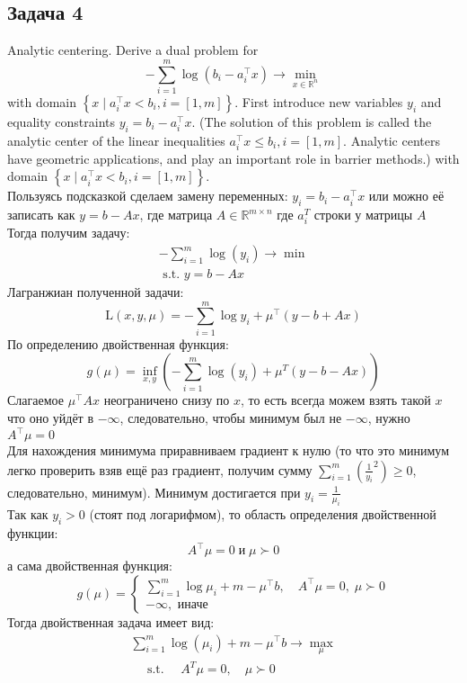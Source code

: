 \documentclass[a4paper,12pt]{article} %
\begin{document}
\subsection*{Задача 4}
Analytic centering. Derive a dual problem for
$$
-\sum_{i=1}^{m} \log \left(b_{i}-a_{i}^{\top} x\right) \rightarrow \min _{x \in \mathbb{R}^{n}}
$$
with domain $\left\{x \mid a_{i}^{\top} x<b_{i}, i=[1, m]\right\} .$ First introduce new variables $y_{i}$ and equality constraints $y_{i}=b_{i}-a_{i}^{\top} x$. (The solution of this problem is called the analytic center of the linear inequalities $a_{i}^{\top} x \leq b_{i}, i=[1, m] .$ Analytic centers have geometric applications, and play an important role in barrier methods.) with domain $\left\{x \mid a_{i}^{\top} x<b_{i}, i=[1, m]\right\}$. \\

Пользуясь подсказкой сделаем замену переменных: $y_{i}=b_{i}-a_{i}^{\top} x$ или можно её записать как $ y = b - Ax $, где матрица $A \in \mathbb{R}^{m \times n} $ где $ a_{i}^{T} $ строки у матрицы $ A $\\
Тогда получим задачу: 
$$
\begin{array}{l}
-\sum_{i=1}^{m} \log \left(y_{i}\right) \rightarrow \min \\
\text { s.t. } y = b - Ax 
\end{array}
$$
Лагранжиан полученной задачи: 
$$
\mathrm{L}(x, y, \mu)=-\sum_{i=1}^{m} \log y_{i}+\mu^{\top}(y-b+A x)
$$
По определению двойственная функция: 
$$
g(\mu)=\inf _{x, y}\left(-\sum_{i=1}^{m} \log \left(y_{i}\right)+\mu^{T}(y-b-A x)\right)
$$
Слагаемое $ \mu^{\top}Ax $ неограничено снизу по $ x $, то есть всегда можем взять такой $ x $ что оно уйдёт в $ -\infty $, следовательно, чтобы минимум был не $ -\infty $, нужно $ A^{\top} \mu = 0 $\\
Для нахождения минимума приравниваем градиент к нулю (то что это минимум легко проверить взяв ещё раз градиент, получим сумму $ \sum\limits_{i=1}^{m} \left( \frac{1}{y_i}^2 \right) \geq 0 $, следовательно, минимум). Минимум достигается при $ y_i = \frac{1}{\mu_i} $\\
Так как $ y_i > 0 $ (стоят под логарифмом), то область определения двойственной функции:
$$
A^{\top} \mu = 0 \; \text{и} \; \mu \succ 0
$$
а сама двойственная функция:
$$
g(\mu)=\left\{\begin{array}{l}
\sum\limits_{i=1}^{m} \log \mu_{i}+m-\mu^{\top} b, \quad A^{\top} \mu=0, \; \mu \succ 0  \\
-\infty, \text { иначе }
\end{array}\right.
$$
Тогда двойственная задача имеет вид:
$$
\begin{array}{l}
\sum\limits_{i=1}^{m} \log \left(\mu_{i}\right)+m-\mu^{\top} b \rightarrow \max\limits _{\mu} \\
\quad \text { s.t. } \quad A^{T} \mu=0, \quad \mu \succ 0
\end{array}
$$
\end{document}

